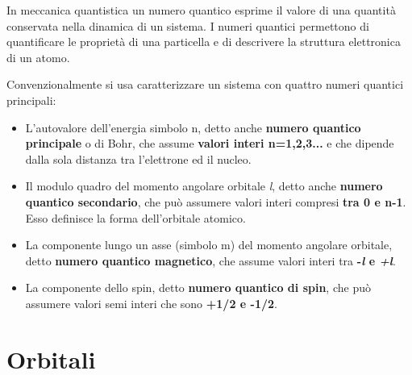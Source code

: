 \documentclass[10pt,a4paper]{article}
\begin{document}
In meccanica quantistica un numero quantico esprime il valore di una quantità conservata nella dinamica di un sistema. I numeri quantici permettono di quantificare le proprietà di una particella e di descrivere la struttura elettronica di un atomo.

Convenzionalmente si usa caratterizzare un sistema con quattro numeri quantici principali:

\begin{itemize}


\item L'autovalore dell'energia simbolo n, detto anche \textbf{numero quantico principale} o di Bohr, che assume \textbf{valori interi n=1,2,3...} e che dipende dalla sola distanza tra l'elettrone ed il nucleo.

\item Il modulo quadro del momento angolare orbitale \textit{l}, detto anche \textbf{numero quantico secondario}, che può assumere valori interi compresi \textbf{tra 0 e n-1}. Esso definisce la forma dell'orbitale atomico.

\item La componente lungo un asse (simbolo m) del momento angolare orbitale, detto \textbf{numero quantico magnetico}, che assume valori interi tra \textbf{-\textit{l} e \textit{+l}}.

\item La componente dello spin, detto \textbf{numero quantico di spin}, che può assumere valori semi interi che sono \textbf{ +1/2 e -1/2}.	
\end{itemize}

\section{Orbitali}
	
\end{document}
